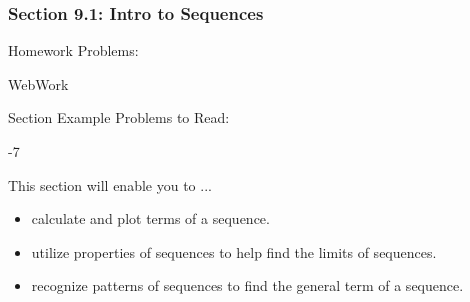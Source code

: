 %
%

\begin{frame}
\frametitle{\Large {\color[rgb]{0.02,0.20,1.0} Section 9.1: Intro to Sequences}}
\scriptsize
\vspace{0.3cm}
\begin{block}{Homework Problems:}

\vspace{0.2cm}
\centering
WebWork
\end{block}
\vspace{0.2cm}

\begin{block}{Section Example Problems to Read:}

\vspace{0.2cm}
-7
	
\end{block}
\vspace{0.2cm}

\begin{block}{This section will enable you to ...}
\begin{itemize}
	\item[...] calculate and plot terms of a sequence.
	\item[...] utilize properties of sequences to help find the limits of sequences. 
	\item[...] recognize patterns of sequences to find the general term of a sequence.
\end{itemize}
\end{block}
\vspace{3.0cm}
\end{frame}

